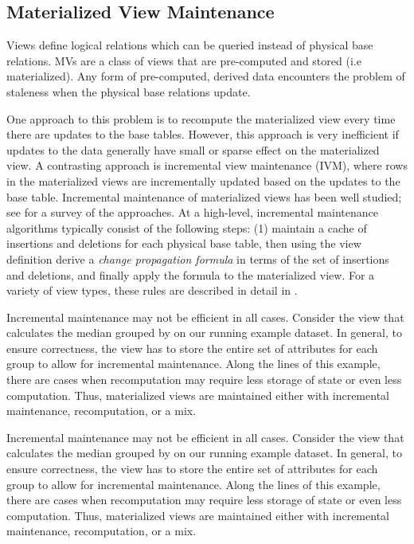 \subsection{Materialized View Maintenance}\label{subsec-inc}
Views define logical relations which can be queried instead of physical base relations.
MVs are a class of views that are pre-computed and stored (i.e materialized).
Any form of pre-computed, derived data encounters the problem of staleness when the physical base relations update.


One approach to this problem is to recompute the materialized view every time there are updates to the base tables.
However, this approach is very inefficient if updates to the data generally have small or sparse effect on the materialized view. 
A contrasting approach is incremental view maintenance (IVM), where rows in the materialized views are incrementally updated based on the updates to the base table.
Incremental maintenance of materialized views has been well studied; see \cite{chirkova2011materialized} for a survey of the approaches. 
At a high-level, incremental maintenance algorithms typically consist of the following steps: (1) maintain a cache of insertions and deletions for each physical base table, then using the view definition derive a \emph{change propagation formula} in terms of the set of insertions and deletions, and finally apply the formula to the materialized view.
For a variety of view types, these rules are described in detail in \cite{DBLP:journals/vldb/KochAKNNLS14, DBLP:conf/pods/Koch10}.

Incremental maintenance may not be efficient in all cases.
Consider the view that calculates the median  grouped by  on our running example dataset.
In general, to ensure correctness, the view has to store the entire set of  attributes for each group to allow for incremental maintenance.
Along the lines of this example, there are cases when recomputation may require less storage of state or even less computation.
Thus, materialized views are maintained either with incremental maintenance, recomputation, or a mix.




 


\iffalse
Incremental maintenance may not be efficient in all cases.
Consider the view that calculates the median  grouped by  on our running example dataset.
In general, to ensure correctness, the view has to store the entire set of  attributes for each group to allow for incremental maintenance.
Along the lines of this example, there are cases when recomputation may require less storage of state or even less computation.
Thus, materialized views are maintained either with incremental maintenance, recomputation, or a mix.



